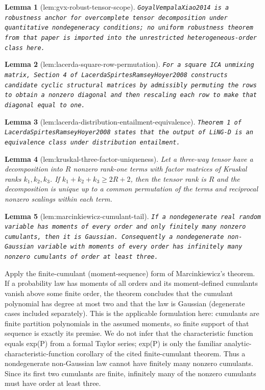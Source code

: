 \documentclass{article}
\newtheorem{lemma}{Lemma}
\begin{document}
\begin{lemma}[lem:gvx-robust-tensor-scope]\label{lem:gvx-robust-tensor-scope}
\texttt{GoyalVempalaXiao2014 is a robustness anchor for overcomplete tensor decomposition under quantitative nondegeneracy conditions;\allowbreak{} no uniform robustness theorem from that paper is imported into the unrestricted heterogeneous-\allowbreak{}order class here.}
\end{lemma}

\begin{lemma}[lem:lacerda-square-row-permutation]\label{lem:lacerda-square-row-permutation}
\texttt{For a square ICA unmixing matrix,\allowbreak{} Section 4 of LacerdaSpirtesRamseyHoyer2008 constructs candidate cyclic structural matrices by admissibly permuting the rows to obtain a nonzero diagonal and then rescaling each row to make that diagonal equal to one.}
\end{lemma}

\begin{lemma}[lem:lacerda-distribution-entailment-equivalence]\label{lem:lacerda-distribution-entailment-equivalence}
\texttt{Theorem 1 of LacerdaSpirtesRamseyHoyer2008 states that the output of LiNG-\allowbreak{}D is an equivalence class under distribution entailment.}
\end{lemma}

\begin{lemma}[lem:kruskal-three-factor-uniqueness]\label{lem:kruskal-three-factor-uniqueness}
Let a three-way tensor have a decomposition into \(R\) nonzero rank-one terms with factor matrices of Kruskal ranks \(k_1,k_2,k_3\). If \(k_1+k_2+k_3\ge 2R+2\), then the tensor rank is \(R\) and the decomposition is unique up to a common permutation of the terms and reciprocal nonzero scalings within each term.
\end{lemma}

\begin{lemma}[lem:marcinkiewicz-cumulant-tail]\label{lem:marcinkiewicz-cumulant-tail}
\texttt{If a nondegenerate real random variable has moments of every order and only finitely many nonzero cumulants,\allowbreak{} then it is Gaussian. Consequently a nondegenerate non-\allowbreak{}Gaussian variable with moments of every order has infinitely many nonzero cumulants of order at least three.}
\end{lemma}
Apply the finite-cumulant (moment-sequence) form of Marcinkiewicz's theorem. If a probability law has moments of all orders and its moment-defined cumulants vanish above some finite order, the theorem concludes that the cumulant polynomial has degree at most two and that the law is Gaussian (degenerate cases included separately). This is the applicable formulation here: cumulants are finite partition polynomials in the assumed moments, so finite support of that sequence is exactly its premise. We do not infer that the characteristic function equals exp(P) from a formal Taylor series; exp(P) is only the familiar analytic-characteristic-function corollary of the cited finite-cumulant theorem. Thus a nondegenerate non-Gaussian law cannot have finitely many nonzero cumulants. Since its first two cumulants are finite, infinitely many of the nonzero cumulants must have order at least three.
\end{document}
